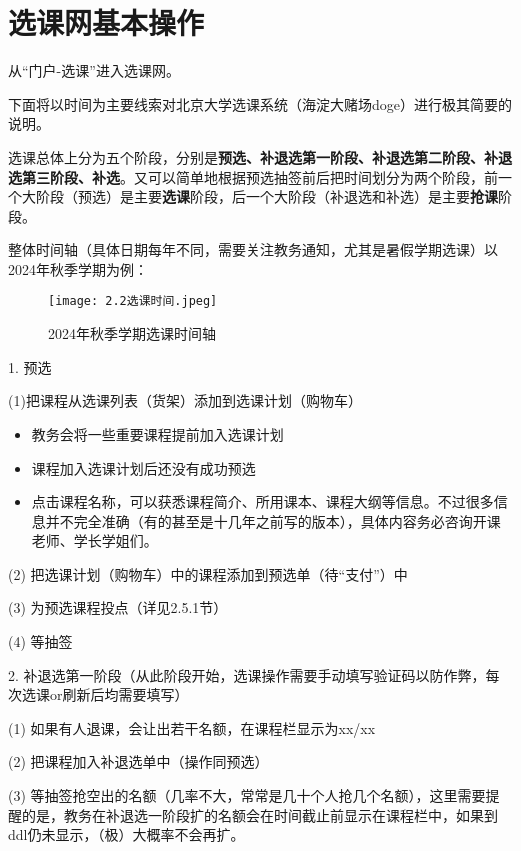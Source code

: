 \documentclass[11pt,oneside]{book}
\begin{document}
\newpage

\section{选课网基本操作}
从“门户-选课”进入选课网。

下面将以时间为主要线索对北京大学选课系统（海淀大赌场doge）进行极其简要的说明。

选课总体上分为五个阶段，分别是\textbf{\textbf{预选、补退选第一阶段、补退选第二阶段、补退选第三阶段、补选}}。又可以简单地根据预选抽签前后把时间划分为两个阶段，前一个大阶段（预选）是主要\textbf{\textbf{选课}}阶段，后一个大阶段（补退选和补选）是主要\textbf{\textbf{抢课}}阶段。

整体时间轴（具体日期每年不同，需要关注教务通知，尤其是暑假学期选课）以2024年秋季学期为例：%
\begin{figure}[htbp]
    \centering
    \texttt{[image: 2.2选课时间.jpeg]}
    \renewcommand{\figurename}{图}
    \caption{2024年秋季学期选课时间轴}
    \label{fig:enter-label}
\end{figure}

1. 预选

(1)把课程从选课列表（货架）添加到选课计划（购物车）

\begin{itemize}
    \item  教务会将一些重要课程提前加入选课计划
    \item 课程加入选课计划后还没有成功预选
    \item 点击课程名称，可以获悉课程简介、所用课本、课程大纲等信息。不过很多信息并不完全准确（有的甚至是十几年之前写的版本），具体内容务必咨询开课老师、学长学姐们。
\end{itemize}

(2) 把选课计划（购物车）中的课程添加到预选单（待“支付”）中

(3) 为预选课程投点（详见2.5.1节）

(4) 等抽签

2. 补退选第一阶段（从此阶段开始，选课操作需要手动填写验证码以防作弊，每次选课or刷新后均需要填写）

(1) 如果有人退课，会让出若干名额，在课程栏显示为xx/xx

(2) 把课程加入补退选单中（操作同预选）

(3) 等抽签抢空出的名额（几率不大，常常是几十个人抢几个名额），这里需要提醒的是，教务在补退选一阶段扩的名额会在时间截止前显示在课程栏中，如果到ddl仍未显示，（极）大概率不会再扩。
\end{document}
